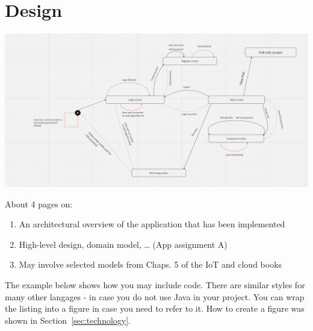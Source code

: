 \section{Design}
\label{sec:design}

\includegraphics[scale=0.4]{figs/ApplicationFlowDiagram.png}



About 4 pages on:

\begin{enumerate}

\item An architectural overview of the application that has been implemented
\item High-level design, domain model, … (App assignment A)
\item May involve selected models from Chaps. 5 of the IoT and cloud books


\end{enumerate}

The example below shows how you may include code. There are similar
styles for many other langages - in case you do not use Java in your
project. You can wrap the listing into a figure in case you need to
refer to it. How to create a figure was shown in Section~\ref{sec:technology}.


